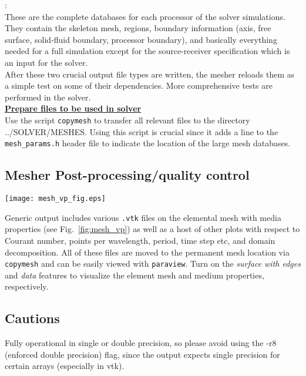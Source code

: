 \documentclass[11pt,letter,fleqn,english,notitlepage]{article}
\begin{document}
: \\
These are the complete databases for each processor of the 
solver simulations. They contain the skeleton mesh, regions, boundary 
information (axis, free surface, solid-fluid boundary, processor boundary), 
and basically everything needed for a full simulation except for the 
source-receiver specification which is an input for the solver. \\

\noindent After these two crucial output file types are written, the mesher reloads them as a
simple test on some of their dependencies. More comprehensive tests are 
performed in the solver. \\

\noindent\textbf{\underline{Prepare files to be used in solver}}\\
Use the script {\tt copymesh} to transfer all relevant files to the directory ../SOLVER/MESHES. 
Using this script is crucial since it adds 
a line to the {\tt mesh\_params.h} header file to indicate the location of the large mesh 
databases.

\subsection{Mesher Post-processing/quality control }
\begin{figure*}[htb]
\begin{center}\label{fig:mesh_vp}
\texttt{[image: mesh\_vp\_fig.eps]}
\caption{\textit{The elemental mesh (blue lines) for IASP91 at 20 seconds superimposed on the $v_p$ velocity. 
The plot is derived straight from the file {\tt mesh\_vp.vtk} produced by the mesher. Zoom sections of the 
central region and crust/upper mantle are added to highlight the topological features.}}
\end{center}
\end{figure*}
%
\noindent Generic output includes various {\tt *.vtk} files on the elemental mesh with media properties 
(see Fig.~\ref{fig:mesh_vp}) as well as a host of other plots with respect to Courant number, 
points per wavelength, period, time step etc, and domain decomposition.
All of these files are moved to the permanent mesh location via {\tt copymesh} and can be easily viewed with {\tt paraview}. 
Turn on the \textit{surface with edges} and \textit{data} features to visualize the element mesh and medium 
properties, respectively.

\subsection{Cautions}
Fully operational in single or double precision, so please avoid using the -r8 (enforced double precision) flag, 
since the output expects single precision for certain arrays (especially in vtk).
\end{document}
